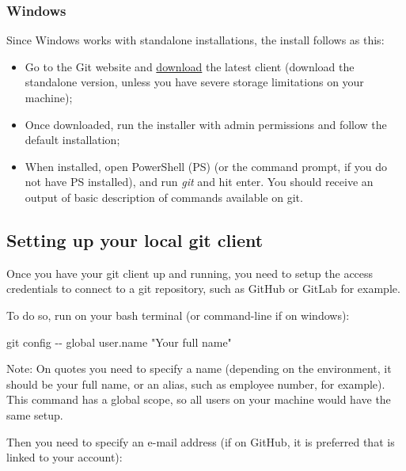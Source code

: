 \documentclass[
]{book}
\newenvironment{Shaded}{\begin{snugshade}}{\end{snugshade}}
\newcommand{\AttributeTok}[1]{\textcolor[rgb]{0.77,0.63,0.00}{#1}}
\newcommand{\FunctionTok}[1]{\textcolor[rgb]{0.00,0.00,0.00}{#1}}
\newcommand{\NormalTok}[1]{#1}
\newcommand{\StringTok}[1]{\textcolor[rgb]{0.31,0.60,0.02}{#1}}
\providecommand{\tightlist}{%
  \setlength{\itemsep}{0pt}\setlength{\parskip}{0pt}}
\begin{document}
\hypertarget{windows}{%
\subsubsection{Windows}\label{windows}}

Since Windows works with standalone installations, the install follows as this:

\begin{itemize}
\tightlist
\item
  Go to the Git website and \href{https://git-scm.com/download/win}{download} the
  latest client (download the standalone version, unless you have severe storage
  limitations on your machine);
\item
  Once downloaded, run the installer with admin permissions and follow the
  default installation;
\item
  When installed, open PowerShell (PS) (or the command prompt, if you do not
  have PS installed), and run \emph{git} and hit enter. You should receive an output of basic
  description of commands available on git.
\end{itemize}

\hypertarget{setting-up-your-local-git-client}{%
\subsection{Setting up your local git client}\label{setting-up-your-local-git-client}}

Once you have your git client up and running, you need to setup the access
credentials to connect to a git repository, such as GitHub or GitLab for example.

To do so, run on your bash terminal (or command-line if on windows):

\begin{Shaded}
\begin{Highlighting}[]
\FunctionTok{git}\NormalTok{ config }\AttributeTok{{-}{-}}\NormalTok{ global user.name }\StringTok{"Your full name"}
\end{Highlighting}
\end{Shaded}

Note: On quotes you need to specify a name (depending on the environment,
it should be your full name, or an alias, such as employee number, for example). This
command has a global scope, so all users on your machine would have the same setup.

Then you need to specify an e-mail address (if on GitHub, it is preferred that
is linked to your account):
\end{document}
